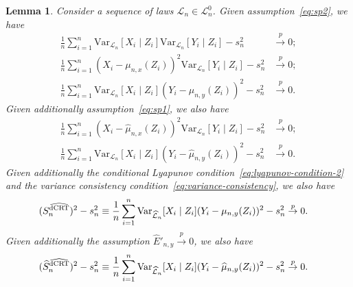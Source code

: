 \documentclass[aos]{imsart}
\newtheorem{lemma}{Lemma}
\theoremstyle{definition}
\theoremstyle{remark}
\newcommand{\V}{\mathrm{Var}}							%
\newcommand{\convp}{\overset p \rightarrow}             %
\newcommand{\srx}{X}									%
\newcommand{\srz}{Z}									%
\newcommand{\sry}{Y}									%
\newcommand{\law}{\mathcal L}							%
\newcommand{\nulllaws}{\mathscr L^0}					%
\newcommand{\lawhat}{\widehat{\mathcal L}}				%
\newcommand{\dCRThat}{\widehat{\textnormal{dCRT}}}		%
\begin{document}
\begin{lemma}
	\label{lem:variance_convg}
	Consider a sequence of laws $\law_n \in \nulllaws_n$. Given assumption~\eqref{eq:sp2}, we have
	\begin{align}
		\frac{1}{n} \sum_{i=1}^n \V_{\law_n}[\srx_i\mid \srz_i]\V_{\law_n}[\sry_i \mid \srz_i] -s^2_n &\convp 0; \label{eq:variance_convg_1} \\ 
		\frac{1}{n}\sum_{i = 1}^n (\srx_i - \mu_{n,x}(\srz_i))^2\V_{\law_n}[\sry_i\mid\srz_i]-s^2_n &\convp 0; \label{eq:variance_convg_2} \\
		\frac{1}{n}\sum_{i = 1}^n \V_{\law_n}[\srx_i\mid\srz_i](\sry_i - \mu_{n,y}(\srz_i))^2-s^2_n &\convp 0. \label{eq:variance_convg_3}
	\end{align}
	Given additionally assumption~\eqref{eq:sp1}, we also have
	\begin{align}
		\frac{1}{n} \sum_{i = 1}^n (\srx_i - \widehat \mu_{n,x}(\srz_i))^2\V_{\law_n}[\sry_i\mid\srz_i] - s^2_n &\convp 0; \label{eq:variance_convg_4} \\
		\frac{1}{n}\sum_{i = 1}^n \V_{\law_n}[\srx_i\mid\srz_i](\sry_i - \widehat \mu_{n,y}(\srz_i))^2-s^2_n &\convp 0. \label{eq:variance_convg_5}
	\end{align}
	Given additionally the conditional Lyapunov condition~\eqref{eq:lyapunov-condition-2} and the variance consistency condition~\eqref{eq:variance-consistency}, we also have
	\begin{align}
		(S^{\dCRThat}_n)^2 - s_n^2 \equiv \frac{1}{n}\sum_{i = 1}^n \V_{\lawhat_n}[\srx_i\mid\srz_i](\sry_i - \mu_{n,y}(\srz_i))^2-s^2_n &\convp 0. \label{eq:variance_convg_6}
	\end{align}
	Given additionally the assumption $\widehat E'_{n,y} \convp 0$, we also have
	\begin{align}
		(\widehat S^{\dCRThat}_n)^2 - s_n^2 \equiv \frac{1}{n}\sum_{i = 1}^n \V_{\lawhat_n}[\srx_i\mid\srz_i](\sry_i - \widehat \mu_{n,y}(\srz_i))^2-s^2_n &\convp 0. \label{eq:variance_convg_7}
	\end{align}
	
\end{lemma}
\end{document}

